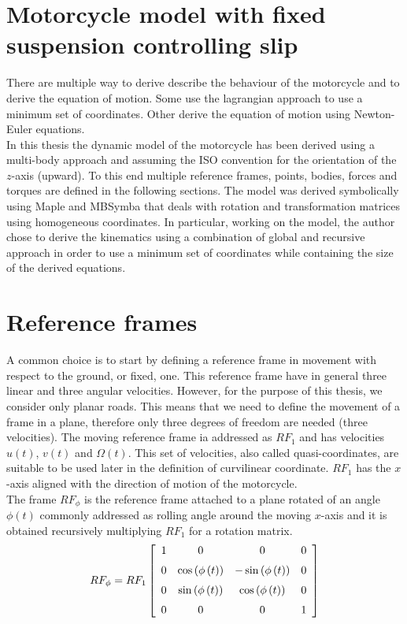 \section{Motorcycle model with fixed suspension controlling slip}

There are multiple way to derive describe the behaviour of the motorcycle and to derive the equation of motion. Some use the lagrangian approach to use a minimum set of coordinates\cite{pacejka2006tyre}\cite{sharp2004advances}\cite{leonelli2019optimal}. Other derive the equation of motion using Newton-Euler equations.\\
In this thesis the dynamic model of the motorcycle has been derived using a multi-body approach and assuming the ISO convention for the orientation of the $z$-axis (upward). To this end multiple reference frames, points, bodies, forces and torques are defined in the following sections. The model was derived symbolically using Maple and MBSymba that deals with rotation and transformation matrices using homogeneous coordinates. In particular, working on the model, the author chose to derive the kinematics using a combination of global and recursive approach in order to use a minimum set of coordinates while containing the size of the derived equations. 

\section{Reference frames}

A common choice is to start by defining a reference frame in movement with respect to the ground, or fixed, one. This reference frame have in general three linear and three angular velocities. However, for the purpose of this thesis, we consider only planar roads. This means that we need to define the movement of a frame in a plane, therefore only three degrees of freedom are needed (three velocities). The moving reference frame ia addressed as $RF_1$ and has velocities $u(t)$, $v(t)$ and $\Omega(t)$. This set of velocities, also called quasi-coordinates, are suitable to be used later in the definition of curvilinear coordinate. $RF_1$ has the $x$-axis aligned with the direction of motion of the motorcycle. \\
The frame $RF_\phi$ is the reference frame attached to a plane rotated of an angle $\phi(t)$ commonly addressed as rolling angle around the moving $x$-axis and it is obtained recursively multiplying $RF_1$ for a rotation matrix.
\begin{equation}
    RF_\phi = RF_1 
    \left[ \begin {array}{cccc} 1&0&0&0\\ \noalign{\medskip}0&\cos
    \left( \phi \left( t \right)  \right) &-\sin \left( \phi \left( t
    \right)  \right) &0\\ \noalign{\medskip}0&\sin \left( \phi \left( t
    \right)  \right) &\cos \left( \phi \left( t \right)  \right) &0
   \\ \noalign{\medskip}0&0&0&1\end {array} \right]   
\end{equation}

